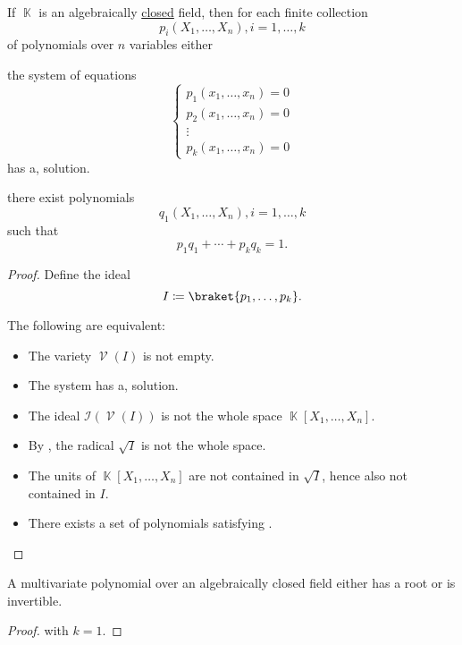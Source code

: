 \begin{corollary}\label{thm:weak_nullstellensatz}
  If \( \BbbK \) is an algebraically \hyperref[def:algebraically_closed_field]{closed} field, then for each finite collection
  \begin{equation*}
    p_i(X_1, \ldots, X_n), i = 1, \ldots, k
  \end{equation*}
  of polynomials over \( n \) variables either
  \begin{thmenum}
     the system of equations
    \begin{equation}\label{thm:weak_nullstellensatz/system}
      \begin{cases}
        p_1(x_1, \ldots, x_n) = 0 \\
        p_2(x_1, \ldots, x_n) = 0 \\
        \vdots                    \\
        p_k(x_1, \ldots, x_n) = 0
      \end{cases}
    \end{equation}
    has a, solution.

     there exist polynomials
    \begin{equation*}
      q_1(X_1, \ldots, X_n), i = 1, \ldots, k
    \end{equation*}
    such that
    \begin{equation*}
      p_1 q_1 + \cdots + p_k q_k = 1.
    \end{equation*}
  \end{thmenum}
\end{corollary}
\begin{proof}
  Define the ideal
  \begin{equation*}
    I \coloneqq \braket{p_1, \ldots, p_k}.
  \end{equation*}

  The following are equivalent:
  \begin{itemize}
    \item The variety \( \mscrV(I) \) is not empty.
    \item The system  has a, solution.
    \item The ideal \( \mathcal{I}(\mscrV(I)) \) is not the whole space \( \BbbK[X_1, \ldots, X_n] \).
    \item By , the radical \( \sqrt I \) is not the whole space.
    \item The units of \( \BbbK[X_1, \ldots, X_n] \) are not contained in \( \sqrt I \), hence also not contained in \( I \).
    \item There exists a set of polynomials satisfying .
  \end{itemize}
\end{proof}

\begin{corollary}\label{thm:polynomial_over_closed_field_is_either_invertible_or_has_root}
  A multivariate polynomial over an algebraically closed field either has a root or is invertible.
\end{corollary}
\begin{proof}
   with \( k = 1 \).
\end{proof}
